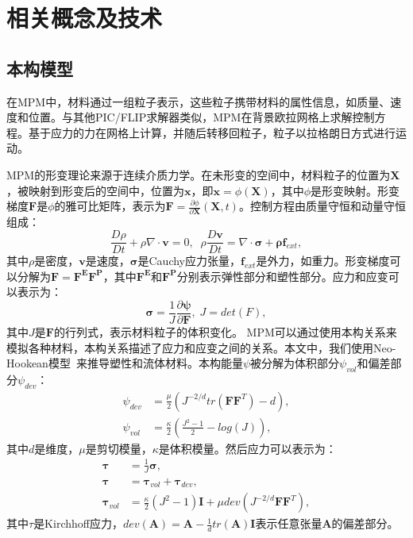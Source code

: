 \chapter{相关概念及技术} \label{chap:background}


\section{本构模型}\label{sect:background:constitutive_model}
在MPM中，材料通过一组粒子表示，这些粒子携带材料的属性信息，如质量、速度和位置。与其他PIC/FLIP求解器类似，MPM在背景欧拉网格上求解控制方程。基于应力的力在网格上计算，并随后转移回粒子，粒子以拉格朗日方式进行运动。

MPM的形变理论来源于连续介质力学。在未形变的空间中，材料粒子的位置为$\mathbf{X}$，被映射到形变后的空间中，位置为$\mathbf{x}$，即$\mathbf{x} = \phi(\mathbf{X})$，其中$\phi$是形变映射。形变梯度$\mathbf{F}$是$\phi$的雅可比矩阵，表示为$\mathbf{F}=\frac{\partial \phi}{\partial \mathbf{X}}(\mathbf{X},t)$。控制方程由质量守恒和动量守恒组成：
\begin{equation}
\frac{D\rho}{Dt}+\rho \nabla \cdot \mathbf{v} = 0, \;\;
\rho \frac{D \mathbf{v}}{Dt} = \nabla \cdot\mathbf{\sigma} + \mathbf{\rho} \mathbf{f}_{ext},
\end{equation}
其中$\rho$是密度，$\mathbf{v}$是速度，$\mathbf{\sigma}$是Cauchy应力张量，$\mathbf{f}_{ext}$是外力，如重力。形变梯度可以分解为$\mathbf{F}=\mathbf{F^E}\mathbf{F^P}$，其中$\mathbf{F^E}$和$\mathbf{F^P}$分别表示弹性部分和塑性部分。应力和应变可以表示为：
\begin{equation}
    \mathbf{\sigma}=\frac{1}{J}\frac{\partial \mathbf{\psi}}{\partial \mathbf{F}}, \; 
    J = det(F),
\end{equation}
其中$J$是$\mathbf{F}$的行列式，表示材料粒子的体积变化。
MPM可以通过使用本构关系来模拟各种材料，本构关系描述了应力和应变之间的关系。本文中，我们使用Neo-Hookean模型~\cite{DBLP:journals/tog/TuLZLWWQ24}来推导塑性和流体材料。本构能量$\psi$被分解为体积部分$\psi_{vol}$和偏差部分$\psi_{dev}$：
\begin{equation}
    \begin{aligned}
        \psi_{dev} &= \frac{\mu}{2}(J^{-2/d} tr(\mathbf{F}\mathbf{F}^T) - d), \\
        \psi_{vol} &= \frac{\kappa}{2}(
        \frac{J^2-1}{2}-log(J)
        ),
    \end{aligned}
\end{equation}
其中$d$是维度，$\mu$是剪切模量，$\kappa$是体积模量。然后应力可以表示为：
\begin{equation}
\begin{aligned}
    \mathbf{\tau} &= \frac{1}{J}\mathbf{\sigma},\\
    \mathbf{\tau} &= \mathbf{\tau}_{vol}+\mathbf{\tau}_{dev},\\
    \mathbf{\tau}_{vol} &= \frac{\kappa}{2}(J^2-1)\mathbf{I}+\mu dev(J^{-2/d} \mathbf{F}\mathbf{F}^T),
\end{aligned}
\end{equation}
其中$\tau$是Kirchhoff应力，$dev(\mathbf{A})=\mathbf{A}-\frac{1}{d}tr(\mathbf{A})\mathbf{I}$表示任意张量$\mathbf{A}$的偏差部分。

